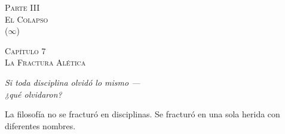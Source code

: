 \documentclass[10pt, openany, oneside]{book}
\renewcommand{\normalsize}{\fontsize{10}{13}\selectfont}
\renewcommand{\large}{\fontsize{11.5}{14}\selectfont}
\renewcommand{\LARGE}{\fontsize{15}{18}\selectfont}
\renewcommand{\huge}{\fontsize{17}{21}\selectfont}
\begin{document}
%
%

\newpage
\thispagestyle{empty}
\vspace*{\fill}
\begin{center}
    {\LARGE\scshape Parte III}\\[1em]
    {\large\scshape El Colapso}\\[0.5em]
    {\normalsize ($\infty$)}
\end{center}
\vspace*{\fill}
\newpage

%
%
%
%

\newpage

\begin{center}
    {\huge\scshape Capítulo 7}\\[0.3em]
    {\large\scshape La Fractura Alética}
\end{center}

\vspace{1.5em}

\begin{center}
    \itshape
    Si toda disciplina olvidó lo mismo ---\\
    ¿qué olvidaron?
\end{center}

\vspace{2em}


\noindent La filosofía no se fracturó en disciplinas. Se fracturó en una sola herida con diferentes nombres.
\end{document}
